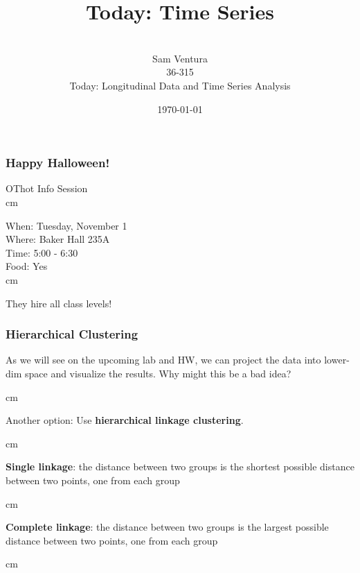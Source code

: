 \documentclass{beamer} %
\begin{document}
\title[dedup]{Today:  Time Series}


\author[Samuel L. Ventura]{\\
  \large{Sam Ventura\\36-315\\Today:  Longitudinal Data and Time Series Analysis}}
\date{\today}


\begin{frame}
	\maketitle

	
\end{frame}



\begin{frame}\frametitle{Happy Halloween!}
	\small
	\centering
	
	OThot Info Session\\

	 cm
	
	When:  Tuesday, November 1\\
	Where:  Baker Hall 235A\\
	Time:  5:00 - 6:30\\
	Food:  Yes\\
	
	 cm
	
	They hire all class levels!
	
	
\end{frame}



\begin{frame}\frametitle{Hierarchical Clustering}
	\small
	
	As we will see on the upcoming lab and HW, we can project the data into lower-dim space and visualize the results.  Why might this be a bad idea?
	
	 cm
	
	Another option:  Use \textbf{hierarchical linkage clustering}.
	
	 cm
	
	\textbf{Single linkage}:  the distance between two groups is the shortest possible distance between two points, one from each group
	
	 cm
	
	\textbf{Complete linkage}:  the distance between two groups is the largest possible distance between two points, one from each group
	
	 cm
	
\end{frame}
\end{document}
